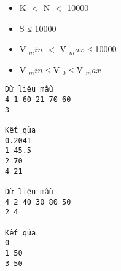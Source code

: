 \begin{itemize}
	\item     K $<$ N $<$ 10000   
	\item     S ≤ 10000   
	\item     V    $_     min    $    $<$ V    $_     max    $    ≤ 10000   
	\item     V    $_     min    $    ≤ V    $_     0    $    ≤ V    $_     max    $
\end{itemize}
\begin{verbatim}
Dữ liệu mẫu
4 1 60 21 70 60
3

Kết qủa
0.2041
1 45.5
2 70
4 21

Dữ liệu mẫu
4 2 40 30 80 50
2 4

Kết qủa
0
1 50
3 50
\end{verbatim}